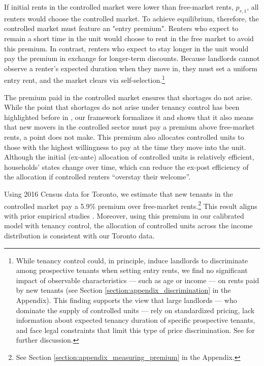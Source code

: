 \documentclass[parskip=full]{article}
\begin{document}
If initial rents in the controlled market were lower than free-market rents, $p_{r,1}$, all renters would choose the controlled market. To achieve equilibrium, therefore, the controlled market must feature an "entry premium". Renters who expect to remain a short time in the unit would choose to rent in the free market to avoid this premium. In contrast, renters who expect to stay longer in the unit would pay the premium in exchange for longer-term discounts. Because landlords cannot observe a renter's expected duration when they move in, they must set a uniform entry rent, and the market clears via self-selection.\footnote{While tenancy control could, in principle, induce landlords to discriminate among prospective tenants when setting entry rents, we find no significant impact of observable characteristics — such as age or income — on rents paid by new tenants (see Section \ref{section:appendix_discrimination} in the Appendix). This finding supports the view that large landlords — who dominate the supply of controlled units — rely on standardized pricing, lack information about expected tenancy duration of specific prospective tenants, and face legal constraints that limit this type of price discrimination. See \citet{be-2000} for further discussion.}

The premium paid in the controlled market ensures that shortages do not arise. While the point that shortages do not arise under tenancy control has been highlighted before in \citet{arnott-1995}, our framework formalizes it and shows that it also means that new movers in the controlled sector must pay a premium above free-market rents, a point \citet{arnott-1995} does not make. This premium also allocates controlled units to those with the highest willingness to pay at the time they move into the unit. Although the initial (ex-ante) allocation of controlled units is relatively efficient, households' states change over time, which can reduce the ex-post efficiency of the allocation if controlled renters ``overstay their welcome''. 

Using 2016 Census data for Toronto, we estimate that new tenants in the controlled market pay a 5.9\% premium over free-market rents.\footnote{See Section \ref{section:appendix_measuring_premium} in the Appendix.} This result aligns with prior empirical studies \citep{nagy-1997,early-2000,cjq-2023}. Moreover, using this premium in our calibrated model with tenancy control, the allocation of controlled units across the income distribution is consistent with our Toronto data.
\end{document}

